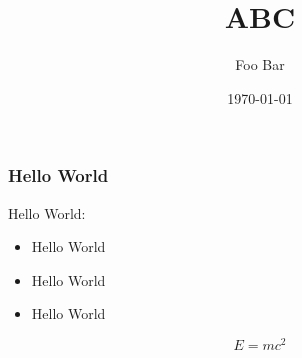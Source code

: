 \documentclass[12pt,t]{beamer}
\title{ABC}
\author[Foo Bar]{Foo Bar}
\institute{Fooniversity}
\date{\today}
\begin{document}
\begin{frame}[plain]
    \titlepage
    \addtocounter{framenumber}{-1}
\end{frame}

\begin{frame}
    \frametitle{Hello World}

    Hello World:
    \begin{itemize}[<+->]
        \item Hello World
        \item Hello World
        \item Hello World
    \end{itemize}

    \begin{equation}
        E = m c^2
    \end{equation}
\end{frame}
\end{document}
